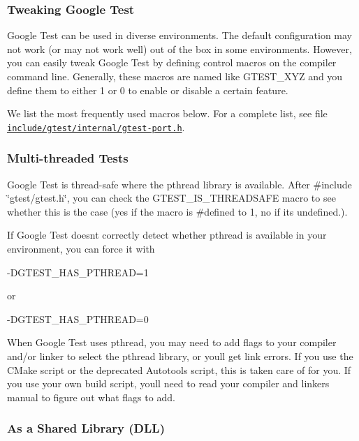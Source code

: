 \subsubsection*{Tweaking Google Test}

Google Test can be used in diverse environments. The default configuration may not work (or may not work well) out of the box in some environments. However, you can easily tweak Google Test by defining control macros on the compiler command line. Generally, these macros are named like {\ttfamily G\+T\+E\+S\+T\+\_\+\+X\+YZ} and you define them to either 1 or 0 to enable or disable a certain feature.

We list the most frequently used macros below. For a complete list, see file \href{https://github.com/google/googletest/blob/master/include/gtest/internal/gtest-port.h}{\tt include/gtest/internal/gtest-\/port.\+h}.

\subsubsection*{Multi-\/threaded Tests}

Google Test is thread-\/safe where the pthread library is available. After {\ttfamily \#include \char`\"{}gtest/gtest.\+h\char`\"{}}, you can check the {\ttfamily G\+T\+E\+S\+T\+\_\+\+I\+S\+\_\+\+T\+H\+R\+E\+A\+D\+S\+A\+FE} macro to see whether this is the case (yes if the macro is {\ttfamily \#defined} to 1, no if it\textquotesingle{}s undefined.).

If Google Test doesn\textquotesingle{}t correctly detect whether pthread is available in your environment, you can force it with \begin{DoxyVerb}-DGTEST_HAS_PTHREAD=1
\end{DoxyVerb}


or \begin{DoxyVerb}-DGTEST_HAS_PTHREAD=0
\end{DoxyVerb}


When Google Test uses pthread, you may need to add flags to your compiler and/or linker to select the pthread library, or you\textquotesingle{}ll get link errors. If you use the C\+Make script or the deprecated Autotools script, this is taken care of for you. If you use your own build script, you\textquotesingle{}ll need to read your compiler and linker\textquotesingle{}s manual to figure out what flags to add.

\subsubsection*{As a Shared Library (D\+LL)}

